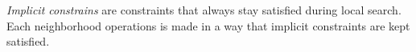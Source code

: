 \emph{Implicit constrains} are constraints that always stay satisfied during local search. 
Each neighborhood operations is made in a way that implicit constraints are kept satisfied. 